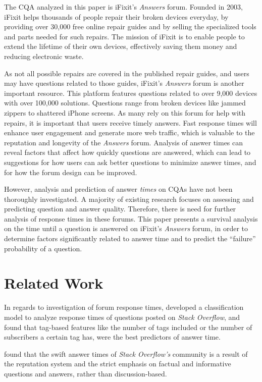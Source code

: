 \documentclass[12pt]{article}
\begin{document}
    The CQA analyzed in this paper is iFixit's \textit{Answers} forum. Founded in 2003, iFixit helps thousands of people repair their broken devices everyday, by providing over 30,000 free online repair guides and by selling the specialized tools and parts needed for such repairs. The mission of iFixit is to enable people to extend the lifetime of their own devices, effectively saving them money and reducing electronic waste. 
    
    As not all possible repairs are covered in the published repair guides, and users may have questions related to those guides, iFixit's \textit{Answers} forum is another important resource. This platform features questions related to over 9,000 devices with over 100,000 solutions. Questions range from broken devices like jammed zippers to shattered iPhone screens. As many rely on this forum for help with repairs, it is important that users receive timely answers. Fast response times will enhance user engagement and generate more web traffic, which is valuable to the reputation and longevity of the \textit{Answers} forum. Analysis of answer times can reveal factors that affect how quickly questions are answered, which can lead to suggestions for how users can ask better questions to minimize answer times, and for how the forum design can be improved. 
    
    However, analysis and prediction of answer \textit{times} on CQAs have not been thoroughly investigated. A majority of existing research focuses on assessing and predicting question and answer quality. Therefore, there is need for further analysis of response times in these forums. This paper presents a survival analysis on the time until a question is answered on iFixit's \textit{Answers} forum, in order to determine factors significantly related to answer time and to predict the ``failure'' probability of a question.

\section{Related Work}

    In regards to investigation of forum response times, \citep{Bhat2014} developed a classification model to analyze response times of questions posted on \textit{Stack Overflow}, and found that tag-based features like the number of tags included or the number of subscribers a certain tag has, were the best predictors of answer time. 

    \citep{Mamykina2011} found that the swift answer times of \textit{Stack Overflow's} community is a result of the reputation system and the strict emphasis on factual and informative questions and answers, rather than discussion-based. 
\end{document}
